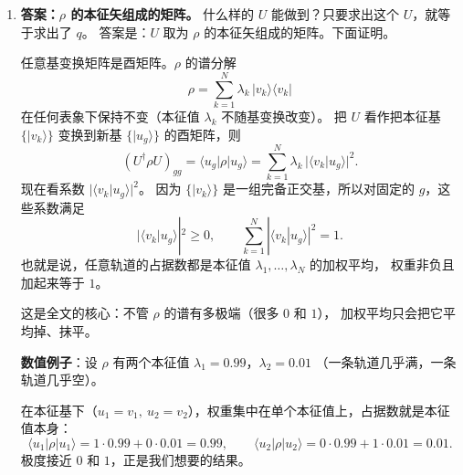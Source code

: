 \documentclass[11pt]{ctexart}
\begin{document}
\begin{enumerate}[leftmargin=2em, itemsep=0.8em]
目前 $\rho$ 看起来是一个纯数值矩阵，但注意到 $i,j$ 指标只在单粒子空间里跑动，
所以我们可以人为定义一个作用在单粒子子空间 $\mathcal{H}_1$ 上的算符
\[
\rho=\sum_{i=1}^{N}\sum_{j=1}^{N}\rho_{ij}\,|i\rangle\langle j| ,
\]
其矩阵元正是
\[
\rho_{ij}=\langle\Psi_0|\,c_j^{\dagger}c_i\,|\Psi_0\rangle .
\]

（物理含义：对角元 $\rho_{ii}=\langle n_i\rangle$ 是格点 $i$ 的平均占据数，
非对角元 $\rho_{ij}$ 是格点 $i,j$ 之间的单粒子关联。
$\rho$ 是厄米矩阵，且 $\operatorname{tr}\rho=\sum_i\langle n_i\rangle=M$，即总粒子数。
在本问题中 $\rho$ 是完整的单粒子密度矩阵。）

把上述求和看成一个矩阵乘法，它恰好就是 $U^{\dagger}\rho U$ 的第 $g$ 个对角元：
\[
\langle q_g^{\dagger}q_g\rangle=(U^{\dagger}\rho U)_{gg} .
\]
于是问题变成了一个非常具体的矩阵问题：

\begin{center}
\textbf{给定厄米矩阵 $\rho$，找一个酉矩阵 $U$，使得 $U^{\dagger}\rho U$ 的对角元尽量接近 $0$ 或 $1$。}
\end{center}

\item \textbf{答案：$\rho$ 的本征矢组成的矩阵。}
什么样的 $U$ 能做到？只要求出这个 $U$，就等于求出了 $q$。
答案是：$U$ 取为 $\rho$ 的本征矢组成的矩阵。下面证明。

任意基变换矩阵是酉矩阵。$\rho$ 的谱分解
\[
\rho=\sum_{k=1}^{N}\lambda_k\,|v_k\rangle\langle v_k|
\]
在任何表象下保持不变（本征值 $\lambda_k$ 不随基变换改变）。
把 $U$ 看作把本征基 $\{|v_k\rangle\}$ 变换到新基 $\{|u_g\rangle\}$ 的酉矩阵，则
\[
(U^{\dagger}\rho U)_{gg}
=\langle u_g|\rho|u_g\rangle
=\sum_{k=1}^{N}\lambda_k\,|\langle v_k|u_g\rangle|^2 .
\]
现在看系数 $|\langle v_k|u_g\rangle|^2$。
因为 $\{|v_k\rangle\}$ 是一组完备正交基，所以对固定的 $g$，这些系数满足
\[
|\langle v_k|u_g\rangle|^2\ge 0 ,
\qquad
\sum_{k=1}^{N}|\langle v_k|u_g\rangle|^2=1 .
\]
也就是说，任意轨道的占据数都是本征值 $\lambda_1,\dots,\lambda_N$ 的加权平均，
权重非负且加起来等于 $1$。

这是全文的核心：不管 $\rho$ 的谱有多极端（很多 $0$ 和 $1$），
加权平均只会把它平均掉、抹平。

\textbf{数值例子}：设 $\rho$ 有两个本征值 $\lambda_1=0.99$，$\lambda_2=0.01$
（一条轨道几乎满，一条轨道几乎空）。

在本征基下（$u_1=v_1,\ u_2=v_2$），权重集中在单个本征值上，占据数就是本征值本身：
\[
\langle u_1|\rho|u_1\rangle=1\cdot 0.99+0\cdot 0.01=0.99,
\qquad
\langle u_2|\rho|u_2\rangle=0\cdot 0.99+1\cdot 0.01=0.01 .
\]
极度接近 $0$ 和 $1$，正是我们想要的结果。


\end{enumerate}
\end{document}
